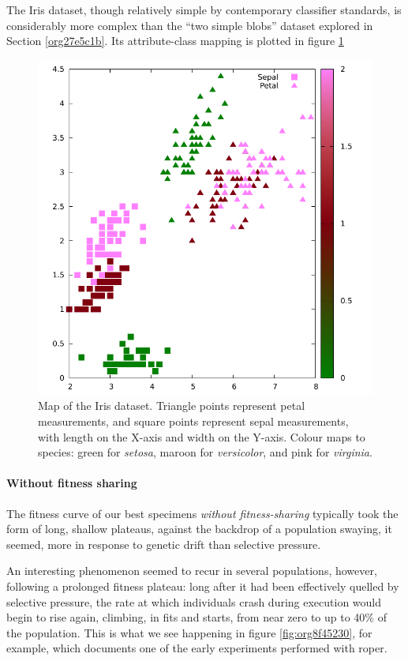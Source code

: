 \documentclass[12pt,glossary]{dalthesis}
\begin{document}
The Iris dataset, though relatively simple by contemporary classifier standards, 
is considerably more complex than the ``two simple blobs'' dataset explored in
Section \ref{org27e5c1b}. Its attribute-class mapping is plotted
in figure \ref{fig:orgd15dd20}

\begin{figure}[htbp]
\centering
\includegraphics[width=.9\linewidth]{../images/plots/iris_plot.pdf}
\caption{\label{fig:orgd15dd20}
Map of the Iris dataset. Triangle points represent petal measurements, and square points represent sepal measurements, with length on the X-axis and width on the Y-axis. Colour maps to species: green for \emph{setosa}, maroon for \emph{versicolor}, and pink for \emph{virginia}.}
\end{figure}


\paragraph{Without fitness sharing}
\label{sec:orgead28fb}

The fitness curve of our best specimens \emph{without fitness-sharing} typically took
the form of long, shallow plateaus, against the backdrop of a population swaying,
it seemed, more in response to genetic drift than selective pressure.

An interesting phenomenon seemed to recur in several populations, however, following
a prolonged fitness plateau: long after it had been effectively quelled by selective
pressure, the rate at which individuals crash during execution would begin to rise
again, climbing, in fits and starts, from near zero to up to 40\% of the population.
This is what we see happening in figure \ref{fig:org8f45230}, for example,
which documents one of the early experiments performed with \gls{roper}.
\end{document}
